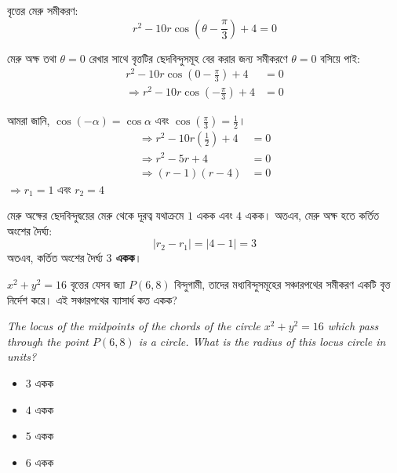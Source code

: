 \documentclass[12pt, a4paper]{article}
\begin{document}
\begin{tcolorbox}[solutionbox={সমাধান (Solution)}]
    \noindent
    বৃত্তের মেরু সমীকরণ: 
    \[ r^2 - 10r \cos\left(\theta - \frac{\pi}{3}\right) + 4 = 0 \]
    
    মেরু অক্ষ তথা $\theta = 0$ রেখার সাথে বৃত্তটির ছেদবিন্দুসমূহ বের করার জন্য সমীকরণে $\theta = 0$ বসিয়ে পাই:
    \begin{align*}
        r^2 - 10r \cos\left(0 - \frac{\pi}{3}\right) + 4 &= 0 \\
        \Rightarrow r^2 - 10r \cos\left(-\frac{\pi}{3}\right) + 4 &= 0
    \end{align*}
    
    আমরা জানি, $\cos(-\alpha) = \cos\alpha$ এবং $\cos\left(\frac{\pi}{3}\right) = \frac{1}{2}$।
    \begin{align*}
        \Rightarrow r^2 - 10r \left(\frac{1}{2}\right) + 4 &= 0 \\
        \Rightarrow r^2 - 5r + 4 &= 0 \\
        \Rightarrow (r - 1)(r - 4) &= 0
    \end{align*}
    $\Rightarrow r_1 = 1$ এবং $r_2 = 4$
    
    মেরু অক্ষের ছেদবিন্দুদ্বয়ের মেরু থেকে দূরত্ব যথাক্রমে $1$ একক এবং $4$ একক। 
    অতএব, মেরু অক্ষ হতে কর্তিত অংশের দৈর্ঘ্য:
    \[ |r_2 - r_1| = |4 - 1| = 3 \]
    অতএব, কর্তিত অংশের দৈর্ঘ্য \textbf{$3$ একক}।
\end{tcolorbox}

\vspace{2em}

\begin{tcolorbox}[questionbox={প্রশ্ন (Question) 11}]
    \noindent
    $x^2 + y^2 = 16$ বৃত্তের যেসব জ্যা $P(6, 8)$ বিন্দুগামী, তাদের মধ্যবিন্দুসমূহের সঞ্চারপথের সমীকরণ একটি বৃত্ত নির্দেশ করে। এই সঞ্চারপথের ব্যাসার্ধ কত একক?
    
    \vspace{0.8em}
    \begin{english}
    \noindent\textit{\color{darkgray}
    The locus of the midpoints of the chords of the circle $x^2 + y^2 = 16$ which pass through the point $P(6, 8)$ is a circle. What is the radius of this locus circle in units?
    }
    \end{english}
\end{tcolorbox}

\vspace{1em}
\begin{itemize}[label={}, leftmargin=1cm, itemsep=0.5em]
    \item[\textbf{A)}] $3$ একক
    \item[\textbf{B)}] $4$ একক
    \item[\textbf{C)}] $5$ একক
    \item[\textbf{D)}] $6$ একক
\end{itemize}
\end{document}
